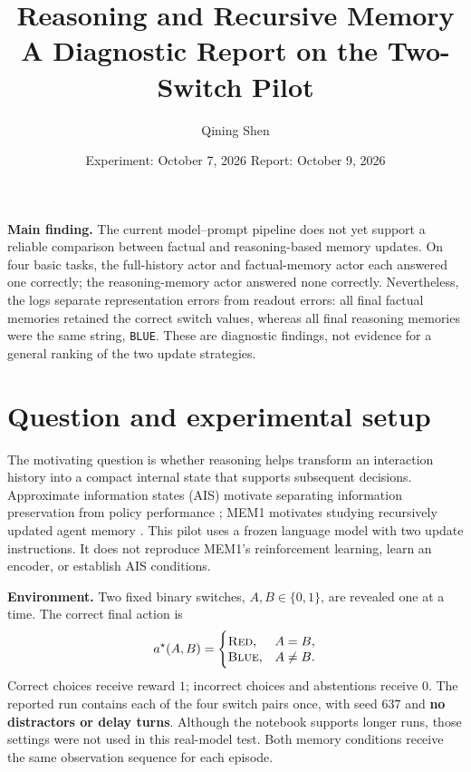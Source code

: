 \documentclass[11pt,letterpaper]{article}
\title{\vspace{-1.7em}\textcolor{accent}{Reasoning and Recursive Memory}\\[3pt]
\large A Diagnostic Report on the Two-Switch Pilot}
\author{Qining Shen}
\date{Experiment: October 7, 2026 \quad Report: October 9, 2026}
\newcommand{\code}[1]{\texttt{#1}}
\newcommand{\red}{\textsc{Red}}
\newcommand{\blue}{\textsc{Blue}}
\begin{document}
\maketitle
\thispagestyle{fancy}
\vspace{-1.2em}

\textbf{Main finding.} The current model--prompt pipeline does not yet support a reliable
comparison between factual and reasoning-based memory updates. On four basic tasks,
the full-history actor and factual-memory actor each answered one correctly; the
reasoning-memory actor answered none correctly. Nevertheless, the logs separate
representation errors from readout errors: all final factual memories retained the
correct switch values, whereas all final reasoning memories were the same string,
\code{BLUE}. These are diagnostic findings, not evidence for a general ranking of
the two update strategies.

\section{Question and experimental setup}
The motivating question is whether reasoning helps transform an interaction history
into a compact internal state that supports subsequent decisions. Approximate information
states (AIS) motivate separating information preservation from policy performance
\cite{ais}; MEM1 motivates studying recursively updated agent memory \cite{mem1}.
This pilot uses a frozen language model with two update instructions. It does not
reproduce MEM1's reinforcement learning, learn an encoder, or establish AIS conditions.

\textbf{Environment.} Two fixed binary switches, $A,B\in\{0,1\}$, are revealed one at
a time. The correct final action is
\[
 a^\star(A,B)=
 \begin{cases}
 \red, & A=B,\\[-2pt]
 \blue, & A\ne B.
 \end{cases}
\]
Correct choices receive reward $1$; incorrect choices and abstentions receive $0$.
The reported run contains each of the four switch pairs once, with seed $637$ and
\textbf{no distractors or delay turns}. Although the notebook supports longer runs,
those settings were not used in this real-model test. Both memory conditions receive
the same observation sequence for each episode.
\end{document}
